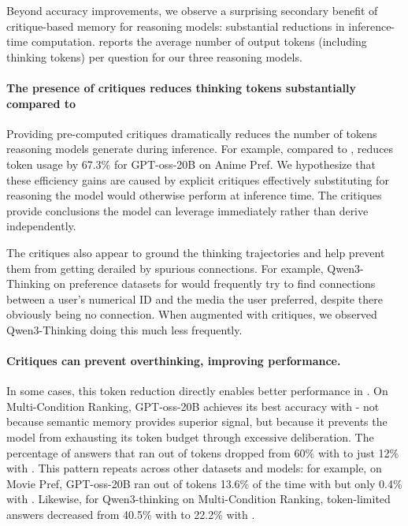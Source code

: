 Beyond accuracy improvements, we observe a surprising secondary benefit of critique-based memory for reasoning models: substantial reductions in inference-time computation.  reports the average number of output tokens (including thinking tokens) per question for our three reasoning models.

\paragraph{The presence of critiques reduces thinking tokens substantially compared to \EPLABEL{}}
Providing pre-computed critiques dramatically reduces the number of tokens reasoning models generate during inference. For example, compared to \EPLABEL{}, \EPCRIT{} reduces token usage by 67.3\% for GPT-oss-20B on Anime Pref. 
We hypothesize that these efficiency gains are caused by explicit critiques effectively substituting for reasoning the model would otherwise perform at inference time. The critiques provide conclusions the model can leverage immediately rather than derive independently. 

The critiques also appear to ground the thinking trajectories and help prevent them from getting derailed by spurious connections. For example, Qwen3-Thinking on preference datasets for \EPLABEL{} would frequently try to find connections between a user's numerical ID and the media the user preferred, despite there obviously being no connection. When augmented with critiques, we observed Qwen3-Thinking doing this much less frequently.

\paragraph{Critiques can prevent overthinking, improving performance.}
In some cases, this token reduction directly enables better performance in . On Multi-Condition Ranking, GPT-oss-20B achieves its best accuracy with \SEMCRIT{} - not because semantic memory provides superior signal, but because it prevents the model from exhausting its token budget through excessive deliberation. The percentage of answers that ran out of tokens dropped from 60\% with \EPLABEL{} to just 12\% with \SEMCRIT{}. This pattern repeats across other datasets and models: for example, on Movie Pref, GPT-oss-20B ran out of tokens 13.6\% of the time with \EPLABEL{} but only 0.4\% with \EPSEMCRIT{}. Likewise, for Qwen3-thinking on Multi-Condition Ranking, token-limited answers decreased from 40.5\% with \EPLABEL{} to 22.2\% with \EPSEMCRIT{}. 

